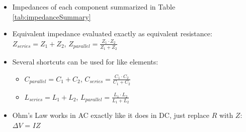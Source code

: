 
\begin{itemize}
\item Impedances of each component summarized in
  Table \ref{tab:impedanceSummary}
\item Equivalent impedance evaluated exactly as equivalent resistance:
  $Z_{series} = Z_1+Z_2$, $Z_{parallel}=\frac{Z_1\cdot Z_2}{Z_1+Z_2}$
\item Several shortcuts can be used for like elements:
  \begin{itemize}
  \item $C_{parallel}=C_1+C_2$, $C_{series} = \frac{C_1\cdot C_2}{C_1+C_2}$
  \item $L_{series} = L_1+L_2$, $L_{parallel} = \frac{L_1\cdot L_2}{L_1+L_2}$
  \end{itemize}
\item Ohm's Law works in AC exactly like it does in DC, just replace $R$ with $Z$: $\Delta V$ = $I Z$
\end{itemize}

